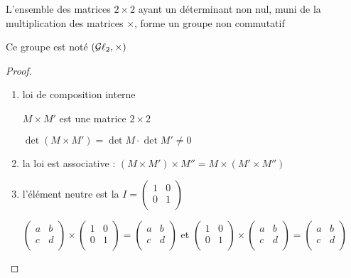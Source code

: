 \begin{frame}



\begin{proposition}
L'ensemble des matrices $2\times 2$ ayant un déterminant non nul,
muni de la multiplication des matrices $\times$, forme un groupe non commutatif
\end{proposition}

\pause

Ce groupe est noté $(\mathcal{G}\ell_2,\times)$

\pause
\bigskip



\begin{proof}
\begin{enumerate}
  \item loi de composition interne 
 
$M\times M'$ est une matrice $2\times 2$

$\det (M\times M') = \det M \cdot \det M' \neq 0$

\pause

  \item  la loi est associative : $(M\times M')\times M''=M \times (M'\times M'')$

\pause

  \item  l'élément neutre est la   
$I = \left(\begin{smallmatrix} 1 & 0 \\ 0 & 1 \\ \end{smallmatrix}\right)$

 
$\left(\begin{smallmatrix} a & b \\ c & d \\ \end{smallmatrix}\right) \times  
\left(\begin{smallmatrix} 1 & 0 \\ 0 & 1 \\ \end{smallmatrix}\right) =
\left(\begin{smallmatrix} a & b \\ c & d \\ \end{smallmatrix}\right)$
et
$\left(\begin{smallmatrix} 1 & 0 \\ 0 & 1 \\ \end{smallmatrix}\right) \times  
\left(\begin{smallmatrix} a & b \\ c & d \\ \end{smallmatrix}\right) =
\left(\begin{smallmatrix} a & b \\ c & d \\ \end{smallmatrix}\right)$


\end{enumerate}
\end{proof}
\end{frame}
